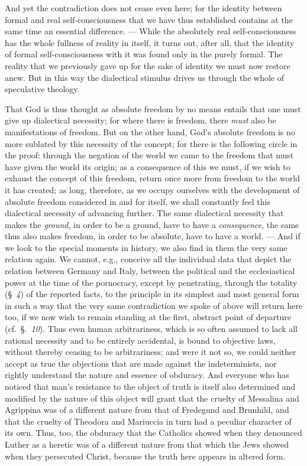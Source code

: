 \documentclass[12pt]{book}
\newcommand{\opage}[1]{\marginnote{\footnotesize\textit{[#1]}}}
\begin{document}
And yet the contradiction does not cease even here; for the identity between
formal and real self-consciousness that we have thus established contains at
the same time an essential difference. --- While the absolutely real
self-consciousness has the whole fullness of reality in itself, it turns out,
after all, that the identity of formal self-consciousness with it was found
only in the purely formal. The reality that we previously gave up for the sake
of identity we must now restore anew. But in this way the dialectical stimulus
drives us through the whole of speculative theology.

That God is thus thought as absolute freedom by no means entails that one must
give up dialectical necessity; for where there is freedom, there \emph{must}
also be manifestations of freedom. But on the other hand, God's absolute
freedom is no more sublated by this necessity of the concept; for there is the
following circle in the proof: through the negation of the world we came to the
freedom that must
\opage{39} have given the world its origin; as a consequence of this we must,
if we wish to exhaust the concept of this freedom, return once more from
freedom to the world it has created; as long, therefore, as we occupy ourselves
with the development of absolute freedom considered in and for itself, we shall
constantly feel this dialectical necessity of advancing further. The same
dialectical necessity that makes the \emph{ground}, in order to be a ground,
have to have a \emph{consequence}, the same thus also makes freedom, in order
to be absolute, have to have a world. --- And if we look to the special moments
in history, we also find in them the very same relation again. We cannot, e.g.,
conceive all the individual data that depict the relation between Germany and
Italy, between the political and the ecclesiastical power at the time of the
pornocracy, except by penetrating, through the totality (§~\textit{4}) of the
reported facts, to the principle in its simplest and most general form in such
a way that the very same contradiction we spoke of above will return here too,
if we now wish to remain standing at the first, abstract point of departure
(cf.\ §.~\textit{10}). Thus even human arbitrariness, which is so often assumed
to lack all rational necessity and to be entirely accidental, is bound to
objective laws, without thereby ceasing to be arbitrariness; and were it not
so, we could neither accept as true the objections that are made against the
indeterminists, nor rightly understand the nature and essence of obduracy. And
everyone who has noticed that man's resistance to the object of truth is itself
also determined and modified by the nature of this object will grant that the
cruelty of Messalina and Agrippina was of a different nature from that of
Fredegund and Brunhild, and that the cruelty of Theodora and Mariuccia in turn
had a peculiar character of its own. Thus, too, the obduracy that the Catholics
\opage{40} showed when they denounced Luther as a heretic was of a different
nature from that which the Jews showed when they persecuted Christ, because the
truth here appears in altered form.
\end{document}
